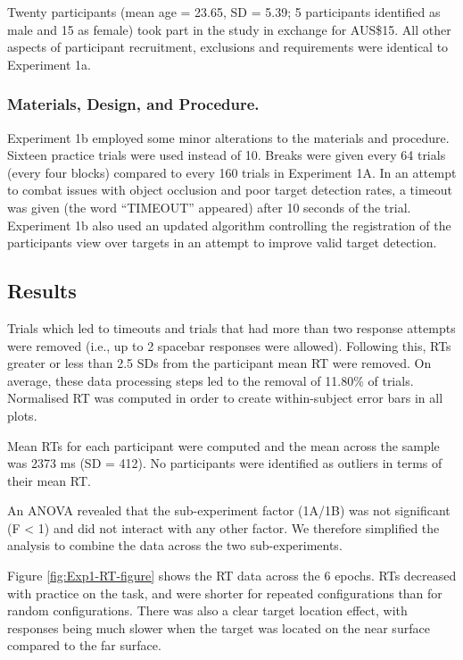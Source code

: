 \documentclass[
  english,
  man,floatsintext]{apa7}
\begin{document}
Twenty participants (mean age = 23.65, SD = 5.39; 5 participants identified as male and 15 as female) took part in the study in exchange for AUS\$15. All other aspects of participant recruitment, exclusions and requirements were identical to Experiment 1a.

\hypertarget{materials-design-and-procedure.}{%
\subsubsection{Materials, Design, and Procedure.}\label{materials-design-and-procedure.}}

Experiment 1b employed some minor alterations to the materials and procedure. Sixteen practice trials were used instead of 10. Breaks were given every 64 trials (every four blocks) compared to every 160 trials in Experiment 1A. In an attempt to combat issues with object occlusion and poor target detection rates, a timeout was given (the word ``TIMEOUT'' appeared) after 10 seconds of the trial. Experiment 1b also used an updated algorithm controlling the registration of the participants view over targets in an attempt to improve valid target detection.

\hypertarget{results}{%
\subsection{Results}\label{results}}

Trials which led to timeouts and trials that had more than two response attempts were removed (i.e., up to 2 spacebar responses were allowed). Following this, RTs greater or less than 2.5 SDs from the participant mean RT were removed. On average, these data processing steps led to the removal of 11.80\% of trials. Normalised RT was computed in order to create within-subject error bars in all plots.

Mean RTs for each participant were computed and the mean across the sample was 2373 ms (SD = 412). No participants were identified as outliers in terms of their mean RT.

An ANOVA revealed that the sub-experiment factor (1A/1B) was not significant (F \textless{} 1) and did not interact with any other factor. We therefore simplified the analysis to combine the data across the two sub-experiments.

Figure \ref{fig:Exp1-RT-figure} shows the RT data across the 6 epochs. RTs decreased with practice on the task, and were shorter for repeated configurations than for random configurations. There was also a clear target location effect, with responses being much slower when the target was located on the near surface compared to the far surface.
\end{document}
